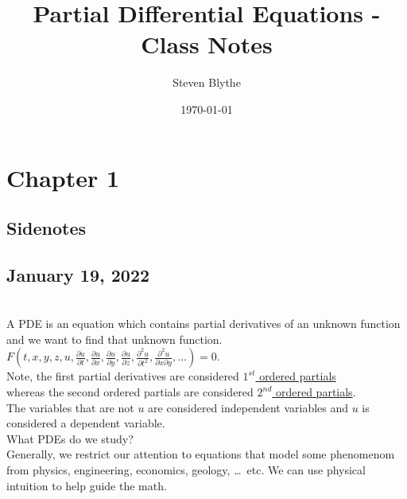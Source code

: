 \documentclass{article}
\title{Partial Differential Equations - Class Notes}
\date{\today}
\author{Steven Blythe}
\begin{document}
\maketitle
\newpage
\section{Chapter 1}
\subsection*{Sidenotes}
\subsection*{January 19, 2022}
\\
A PDE is an equation which contains partial derivatives of an unknown function and we want to find that unknown function.\\
\Ex $F(t, x, y, z, u, \frac{\partial u}{\partial t}, \frac{\partial u}{\partial x}, \frac{\partial u}{\partial y}, \frac{\partial u}{\partial z}, \frac{\partial^2 u}{\partial t^2}, \frac{\partial^2 u}{\partial x \partial y}, \ldots) = 0$.\\
Note, the first partial derivatives are considered \underline{$1^{st}$ ordered partials}\\
whereas the second ordered partials are considered \underline{$2^{nd}$ ordered partials}.\\
The variables that are not $u$ are considered independent variables and $u$ is considered a dependent variable.\\
What PDEs do we study?\\
Generally, we restrict our attention to equations that model some phenomenom from physics, engineering, economics, geology, \ldots\ etc. We can use physical intuition to help guide the math.\\
\end{document}
